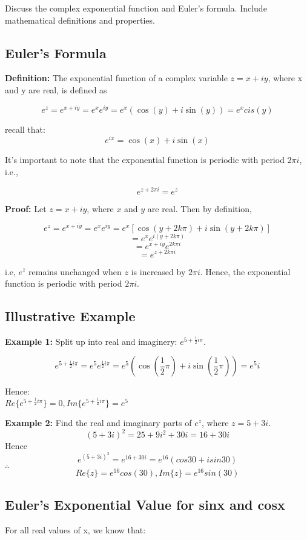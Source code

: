 \documentclass[12pt]{article}
\begin{document}
Discuss the complex exponential function and Euler's formula. Include mathematical definitions and properties.

\subsection{Euler's Formula}

\textbf{Definition:} The exponential function of a complex variable $z = x + iy$, where x and y are real, is defined as

\[e^{z} = e^{x + iy} = e^{x}e^{iy} = e^{x}(\cos(y) + i \sin(y)) = e^{x}cis(y) \]

recall that:
\[ e^{ix} =  \cos(x) + i \sin(x) \]

It's important to note that the exponential function is periodic with period $2\pi i$, i.e.,

\[e^{z + 2\pi i} = e^{z} \]

\textbf{Proof:} Let $z = x + iy$, where $x$ and $y$ are real. Then by definition,

\[ e^{z} = e^{x + iy} = e^{x}e^{iy} = e^{x}[\cos(y+ 2k\pi) + i \sin(y + 2k\pi)] \]
\[ =  e^{x}e^{i(y + 2k\pi)} \]
\[ =  e^{x+iy}e^{2k\pi i} \]
\[ =  e^{z + 2k\pi i} \]

i.e, $e^{z}$ remains unchanged when $z$ is increased by $2\pi i$. Hence, the exponential function is periodic with period $2\pi i$.


\subsection{Illustrative Example}

\textbf{Example 1:} Split up into real and imaginery:
$e^{5 + {\frac{1}{2}i\pi}}$.

\[e^{5 + {\frac{1}{2}i\pi}} = e^{5}e^{\frac{1}{2}i\pi} = e^{5}(\cos(\frac{1}{2}\pi) + i \sin(\frac{1}{2}\pi)) = e^{5}i \]

Hence: \\

$Re\{e^{5 + {\frac{1}{2}i\pi}}\} = 0, Im\{e^{5 + {\frac{1}{2}i\pi}}\} = e^{5}$



\textbf{Example 2:} Find the real and imaginary parts of $e^{z}$, where $z = 5 + 3i$.
\[(5 + 3i)^{2} = 25 + 9i^{2} + 30i = 16 + 30i\]
Hence
\[e^{(5+3i)^{2}} = e^{16+30i} = e^{16}(cos30+isin30)\]
$\therefore$
\[Re\{z\} = e^{16}cos(30), Im\{z\} = e^{16}sin(30)\]


\subsection{Euler's Exponential Value for sinx and cosx}
For all real values of x, we know that:
\end{document}
